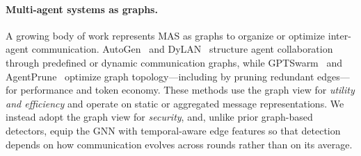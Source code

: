 \paragraph{Multi-agent systems as graphs.}
A growing body of work represents MAS as graphs to organize or optimize
inter-agent communication. AutoGen~\citep{wu2023autogen} and
DyLAN~\citep{liu2023dylan} structure agent collaboration through predefined or
dynamic communication graphs, while GPTSwarm~\citep{zhuge2024gptswarm} and
AgentPrune~\citep{zhang2024agentprune} optimize graph topology---including by
pruning redundant edges---for performance and token economy. These methods use
the graph view for \emph{utility and efficiency} and operate on static or
aggregated message representations. We instead adopt the graph view for
\emph{security}, and, unlike prior graph-based detectors, equip the GNN with
temporal-aware edge features so that detection depends on how communication
evolves across rounds rather than on its average.
